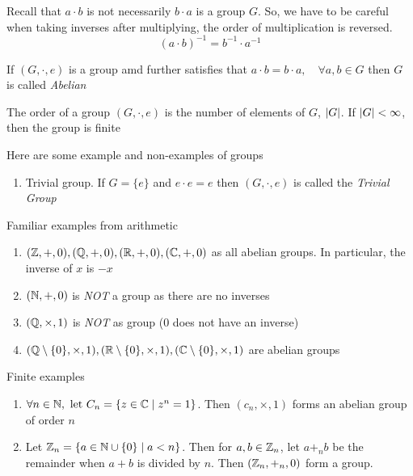 \documentclass{article}
\begin{document}
\begin{remark}
    Recall that $a \cdot b$ is not necessarily $b \cdot a$ is a group $G$. So, we have to be careful when taking inverses after multiplying, the order of multiplication is reversed.
    \[
        (a \cdot b)^{-1} = b^{-1} \cdot a^{-1}  
    \]
\end{remark}

\begin{defi}
    If $(G, \cdot, e)$ is a group amd further satisfies that $a \cdot b = b \cdot a, \quad \forall a, b \in G$ then $G$ is called \emph{Abelian}
\end{defi}

\begin{defi}
    The order of a group $(G, \cdot, e)$ is the number of elements of $G$, $\left\lvert G\right\rvert$. If $\left\lvert G\right\rvert < \infty$, then the group is finite
\end{defi}

\begin{eg}
    Here are some example and non-examples of groups
    \begin{enumerate}
        \item Trivial group. If $G = \{e\}$ and $e \cdot e = e$ then $(G, \cdot, e)$ is called the \emph{Trivial Group}
    \end{enumerate}
    Familiar examples from arithmetic
    \begin{enumerate}[resume]
        \item $(\mathbb{Z}, +, 0), (\mathbb{Q}, +, 0), (\mathbb{R}, +, 0), (\mathbb{C}, +, 0)$ as all abelian groups. In particular, the inverse of $x$ is $-x$
        \item $(\mathbb{N}, +, 0)$ is \emph{NOT} a group as there are no inverses
        \item $(\mathbb{Q}, \times, 1)$ is \emph{NOT} as group (0 does not have an inverse)
        \item $(\mathbb{Q} \setminus \{0\}, \times, 1), (\mathbb{R} \setminus \{0\}, \times, 1), (\mathbb{C} \setminus \{0\}, \times, 1)$ are abelian groups
    \end{enumerate}
    Finite examples
    \begin{enumerate}[resume]
        \item $\forall n \in \mathbb{N}, \ \text{let} \ C_n = \{z \in \mathbb{C} \mid z^n = 1\}$. Then $(c_n, \times, 1)$ forms an abelian group of order $n$
        \item Let $\mathbb{Z}_n = \{a \in \mathbb{N} \cup \{0\} \mid a < n\}$. Then for $a, b \in \mathbb{Z}_n$, let $a +_n b$ be the remainder when $a + b$ is divided by $n$. Then $(\mathbb{Z}_n, +_n, 0)$ form a group.
    \end{enumerate}
\end{eg}
\end{document}
